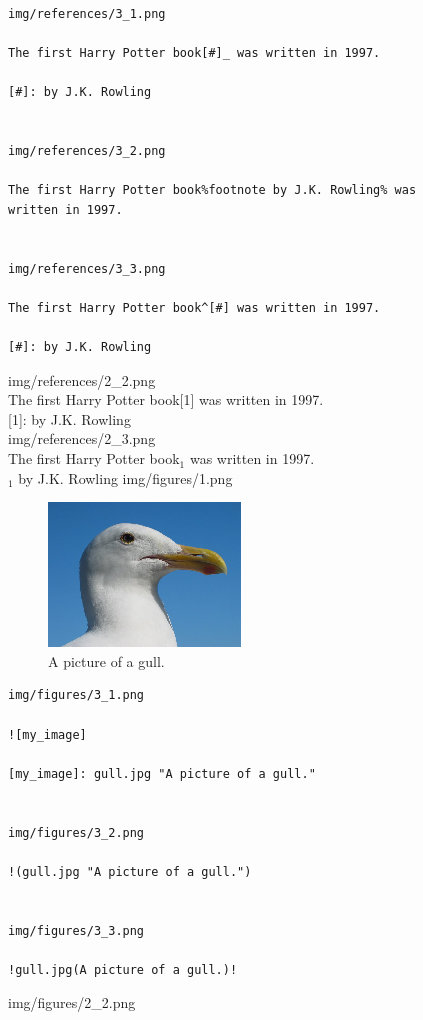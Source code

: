 \documentclass[14pt]{article}
\begin{document}
\newpage
\begin{verbatim}
img/references/3_1.png

The first Harry Potter book[#]_ was written in 1997.

[#]: by J.K. Rowling


img/references/3_2.png

The first Harry Potter book%footnote by J.K. Rowling% was
written in 1997.


img/references/3_3.png

The first Harry Potter book^[#] was written in 1997.

[#]: by J.K. Rowling

\end{verbatim}
\noindent
img/references/2\_2.png\\[.5cm]
The first Harry Potter book[1] was written in 1997.\\[1cm]
[1]: by J.K. Rowling\\[1cm]
img/references/2\_3.png\\[.5cm]
The first Harry Potter book$_1$ was written in 1997.\\[1cm]
$_1$ by J.K. Rowling
\newpage
img/figures/1.png\\[.5cm]
\begin{figure}[H]
\begin{center}
\includegraphics[scale=1]{../../img/gull.png}
\caption{A picture of a gull.}
\end{center}
\end{figure}
\noindent
\begin{verbatim}
img/figures/3_1.png

![my_image]

[my_image]: gull.jpg "A picture of a gull."


img/figures/3_2.png

!(gull.jpg "A picture of a gull.")


img/figures/3_3.png

!gull.jpg(A picture of a gull.)!

\end{verbatim}
\newpage
\noindent
img/figures/2\_2.png\\[.5cm]
\end{document}
